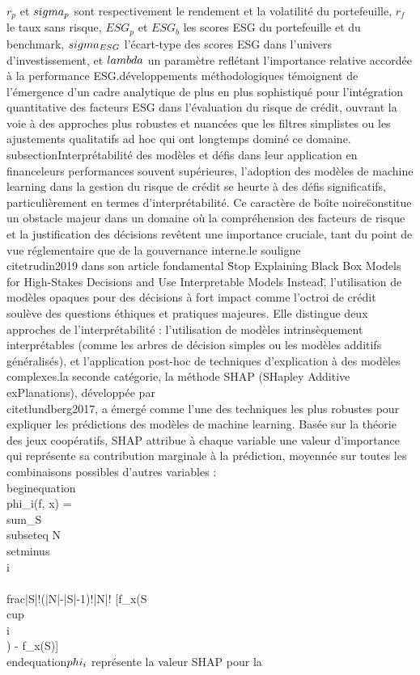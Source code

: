 $r_p$ et $\\sigma_p$ sont respectivement le rendement et la volatilité du portefeuille, $r_f$ le taux sans risque, $ESG_p$ et $ESG_b$ les scores ESG du portefeuille et du benchmark, $\\sigma_{ESG}$ l'écart-type des scores ESG dans l'univers d'investissement, et $\\lambda$ un paramètre reflétant l'importance relative accordée à la performance ESG.\n\nCes développements méthodologiques témoignent de l'émergence d'un cadre analytique de plus en plus sophistiqué pour l'intégration quantitative des facteurs ESG dans l'évaluation du risque de crédit, ouvrant la voie à des approches plus robustes et nuancées que les filtres simplistes ou les ajustements qualitatifs ad hoc qui ont longtemps dominé ce domaine.\n\n\\subsection{Interprétabilité des modèles et défis dans leur application en finance}\n{} leurs performances souvent supérieures, l'adoption des modèles de machine learning dans la gestion du risque de crédit se heurte à des défis significatifs, particulièrement en termes d'interprétabilité. Ce caractère de \"boîte noire\" constitue un obstacle majeur dans un domaine où la compréhension des facteurs de risque et la justification des décisions revêtent une importance cruciale, tant du point de vue réglementaire que de la gouvernance interne.\n\nComme le souligne \\citet{rudin2019} dans son article fondamental \"Stop Explaining Black Box Models for High-Stakes Decisions and Use Interpretable Models Instead\", l'utilisation de modèles opaques pour des décisions à fort impact comme l'octroi de crédit soulève des questions éthiques et pratiques majeures. Elle distingue deux approches de l'interprétabilité : l'utilisation de modèles intrinsèquement interprétables (comme les arbres de décision simples ou les modèles additifs généralisés), et l'application post-hoc de techniques d'explication à des modèles complexes.\n\nDans la seconde catégorie, la méthode SHAP (SHapley Additive exPlanations), développée par \\citet{lundberg2017}, a émergé comme l'une des techniques les plus robustes pour expliquer les prédictions des modèles de machine learning. Basée sur la théorie des jeux coopératifs, SHAP attribue à chaque variable une valeur d'importance qui représente sa contribution marginale à la prédiction, moyennée sur toutes les combinaisons possibles d'autres variables :\n\n\\begin{equation}\n\\phi_i(f, x) = \\sum_{S \\subseteq N \\setminus \\{i\\}} \\frac{|S|!(|N|-|S|-1)!}{|N|!} [f_x(S \\cup \\{i\\}) - f_x(S)]\n\\end{equation}\n{} $\\phi_i$ représente la valeur SHAP pour la 